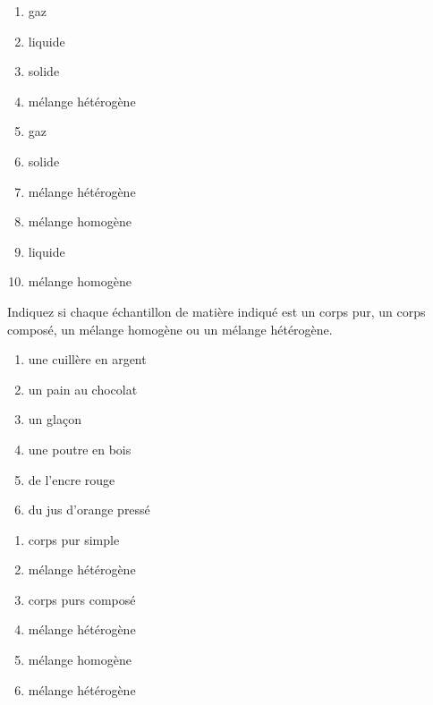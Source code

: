 \documentclass[
  11pt,
  a4paper,
  openany]{book}
\providecommand{\tightlist}{%
  \setlength{\itemsep}{0pt}\setlength{\parskip}{0pt}}
\begin{document}
\begin{Answer}

\begin{enumerate}
\def\labelenumi{\alph{enumi}.}
\tightlist
\item
  gaz
\item
  liquide
\item
  solide
\item
  mélange hétérogène
\item
  gaz
\item
  solide
\item
  mélange hétérogène
\item
  mélange homogène
\item
  liquide
\item
  mélange homogène
\end{enumerate}

\end{Answer}

\newpage

\begin{Exercise}

Indiquez si chaque échantillon de matière indiqué est un corps pur, un corps composé, un mélange homogène ou un mélange hétérogène.

\begin{enumerate}
\def\labelenumi{\arabic{enumi}.}
\tightlist
\item
  une cuillère en argent
\item
  un pain au chocolat
\item
  un glaçon
\item
  une poutre en bois
\item
  de l'encre rouge
\item
  du jus d'orange pressé
\end{enumerate}

\end{Exercise}

\begin{Answer}

\begin{enumerate}
\def\labelenumi{\arabic{enumi}.}
\tightlist
\item
  corps pur simple
\item
  mélange hétérogène
\item
  corps purs composé
\item
  mélange hétérogène
\item
  mélange homogène
\item
  mélange hétérogène
\end{enumerate}

\end{Answer}
\end{document}
